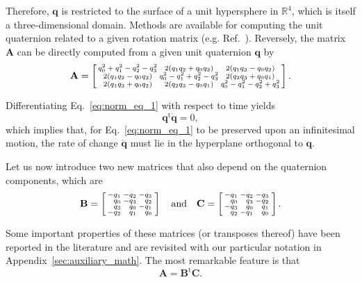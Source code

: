 \documentclass[aip,jcp,reprint,amsmath,amssymb]{revtex4-1}
\makeatletter
\newcommand{\mt}[1]{\boldsymbol{\mathbf{#1}}}           %
\newcommand{\vt}[1]{\boldsymbol{\mathbf{#1}}}           %
\newcommand{\tr}[1]{#1^\text{t}}                        %
\newenvironment{smallarray}[1]                          %
{\null\,\vcenter\bgroup\scriptsize
	\renewcommand{\arraystretch}{0.7}
	\arraycolsep=.13885em
	\hbox\bgroup$\array{@{}#1@{}}}
{\endarray$\egroup\egroup\,\null}
\makeatother
\begin{document}
Therefore, $\vt q$ is restricted to the surface of a unit hypersphere in $\mathbb{R}^4$, which is itself a three-dimensional domain. Methods are available for computing the unit quaternion related to a given rotation matrix (e.g. Ref.~). Reversely, the matrix $\mt A$ can be directly computed from a given unit quaternion $\vt q$ by\cite{Allen1989,Miller2002}
\begin{equation}
\label{eq:A_from_q}
\mt A = \left[ \begin{smallarray}{ccc}
q_0^2 + q_1^2 - q_2^2 - q_3^2 & 2(q_1 q_2 + q_0 q_3) & 2(q_1 q_3 - q_0 q_2) \\
2(q_1 q_2 - q_0 q_3) & q_0^2 - q_1^2 + q_2^2 - q_3^2 & 2(q_2 q_3 + q_0 q_1) \\
2(q_1 q_3 + q_0 q_2) & 2(q_2 q_3 - q_0 q_1) & q_0^2 - q_1^2 - q_2^2 + q_3^2  
\end{smallarray} \right].
\end{equation}

Differentiating Eq.~\ref{eq:norm_eq_1} with respect to time yields
\begin{equation}
\label{eq:diff_qTq}
\tr{\vt q}\dot{\vt q} = 0,
\end{equation}
which implies that, for Eq.~\ref{eq:norm_eq_1} to be preserved upon an infinitesimal motion, the rate of change $\dot{\vt q}$ must lie in the hyperplane orthogonal to $\vt q$.

Let us now introduce two new matrices that also depend on the quaternion components, which are
\begin{equation}
\label{eq:def_B_and_C}
\mt B = \left[
\begin{smallarray}{rrrr}
-q_1 & -q_2 & -q_3 \\
 q_0 & -q_3 &  q_2 \\
 q_3 &  q_0 & -q_1 \\
-q_2 &  q_1 &  q_0
\end{smallarray}
\right]
\quad \text{and} \quad
\mt C = \left[
\begin{smallarray}{rrrr}
-q_1 & -q_2 & -q_3 \\
 q_0 &  q_3 & -q_2 \\
-q_3 &  q_0 &  q_1 \\
 q_2 & -q_1 &  q_0
\end{smallarray}
\right].
\end{equation}

Some important properties of these matrices (or transposes thereof) have been reported in the literature\cite{Haug1989, Shuster1993, Dichmann1999, Ravishankar2004, Nielsen2012} and are revisited with our particular notation in Appendix~\ref{sec:auxiliary_math}. The most remarkable feature is that
\begin{equation}
\label{eq:factorization_of_A}
{\mt A} = \tr{\mt B}{\mt C}.
\end{equation}
\end{document}

